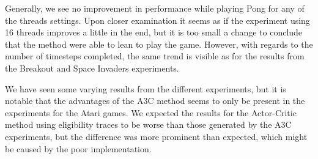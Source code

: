 \documentclass[11pt]{article}
\begin{document}
Generally, we see no improvement in performance while playing Pong for any of the threads settings.
Upon closer examination it seems as if the experiment using 16 threads improves a little
in the end, but it is too small a change to conclude that the method were able to lean to play the
game.
However, with regards to the number of timesteps completed,
the same trend is visible as for the results from the Breakout and Space
Invaders experiments.

We have seen some varying results from the different experiments, but
it is notable that the advantages of the A3C method seems to only
be present in the experiments for the Atari games.
We expected the results for the Actor-Critic method using eligibility traces
to be worse than those generated by the A3C experiments, 
but the difference was more prominent than expected, which
might be caused by the poor implementation.
\end{document}
